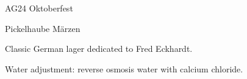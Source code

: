 \begin{recipe}{AG24 Oktoberfest}
\begin{recipe}{Pickelhaube Märzen} %

\begin{aboutblock}
Classic German lager dedicated to Fred Eckhardt.
\sourceaha
\end{aboutblock}


\begin{methodandtiming}

\begin{mashsteps}
\end{mashsteps}

\begin{fermentationsteps}
\end{fermentationsteps}

\begin{directions}
Water adjustment: reverse osmosis water with  calcium chloride.
\end{directions}

\end{methodandtiming}

\recipebreak

\begin{ingredientsblock}

\begin{malts}
\end{malts}

\begin{hops}
\end{hops}


\end{ingredientsblock}

\end{recipe}


\end{recipe}

